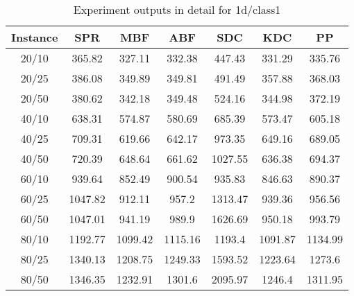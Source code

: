 \begin{table}[ht!]
    \caption{Experiment outputs in detail for 1d/class1}
    \centering
    \begin{tabular}{@{}ccccccc@{}}
        \toprule
        {\bfseries Instance} & {\bfseries SPR} & {\bfseries MBF}
        & {\bfseries ABF} & {\bfseries SDC} & {\bfseries KDC} & {\bfseries PP}\\
        \midrule
        20/10 & 365.82 & 327.11 & 332.38 & 447.43 & 331.29 & 335.76\\
        20/25 & 386.08 & 349.89 & 349.81 & 491.49 & 357.88 & 368.03\\
        20/50 & 380.62 & 342.18 & 349.48 & 524.16 & 344.98 & 372.19\\
        40/10 & 638.31 & 574.87 & 580.69 & 685.39 & 573.47 & 605.18\\
        40/25 & 709.31 & 619.66 & 642.17 & 973.35 & 649.16 & 689.05\\
        40/50 & 720.39 & 648.64 & 661.62 & 1027.55 & 636.38 & 694.37\\
        60/10 & 939.64 & 852.49 & 900.54 & 935.83 & 846.63 & 890.37\\
        60/25 & 1047.82 & 912.11 & 957.2 & 1313.47 & 939.36 & 956.56\\
        60/50 & 1047.01 & 941.19 & 989.9 & 1626.69 & 950.18 & 993.79\\
        80/10 & 1192.77 & 1099.42 & 1115.16 & 1193.4 & 1091.87 & 1134.99\\
        80/25 & 1340.13 & 1208.75 & 1249.33 & 1593.52 & 1223.64 & 1273.6\\
        80/50 & 1346.35 & 1232.91 & 1301.6 & 2095.97 & 1246.4 & 1311.95\\
        \bottomrule
    \end{tabular}
\end{table}